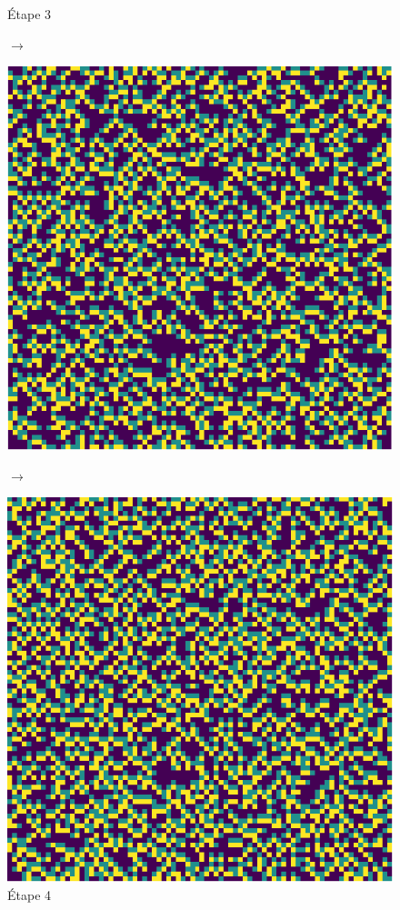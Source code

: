 \documentclass[12pt, a4paper]{article}
\begin{document}
\begin{center}
\begin{figure}[!h]
\begin{minipage}{.3\linewidth}
                    \caption{Étape 3}
                \end{minipage}
            \end{figure}
            \begin{figure}[!h]
                \centering
                $\rightarrow$
                \begin{minipage}{.3\linewidth}
                    \centering
                    \includegraphics[scale=0.2]{img/step4.png}
                    \caption{Étape 4}
                \end{minipage}
                $\rightarrow$
                \begin{minipage}{.3\linewidth}
                    \centering
                    \includegraphics[scale=0.2]{img/step5.png}

\end{minipage}
\end{figure}
\end{center}
\end{document}
